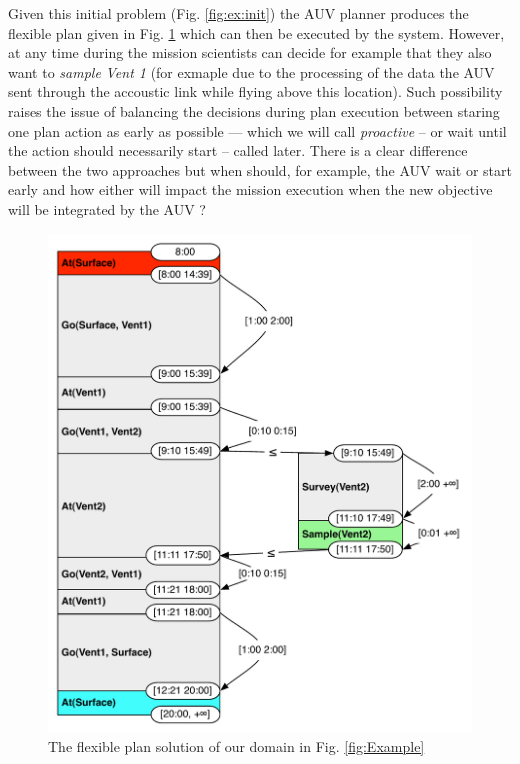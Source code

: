 Given this initial problem (Fig. \ref{fig:ex:init}) the AUV planner
produces the flexible plan given in Fig. \ref{fig:ex:plan} which can
then be executed by the system. However, at any time during the
mission scientists can decide for example that they also want to {\em
  sample} {\em Vent 1} (for exmaple due to the processing of the data
the AUV sent through the accoustic link while flying above this
location). Such possibility raises the issue of balancing the
decisions during plan execution between staring one plan action as
early as possible --- which we will call {\em proactive} -- or wait
until the action should necessarily start -- called later. There is a 
clear difference between the two approaches but when should, for 
example, the AUV wait or start early and how either will impact the
mission execution when the new objective will be integrated by the 
AUV ? 

\begin{figure}[!htb]
  \centering
  \includegraphics[width=0.8\columnwidth]{figs/example_plan}
  \caption{The flexible plan solution of our domain in
    Fig. \ref{fig:Example}}
  \label{fig:ex:plan}
\end{figure}

